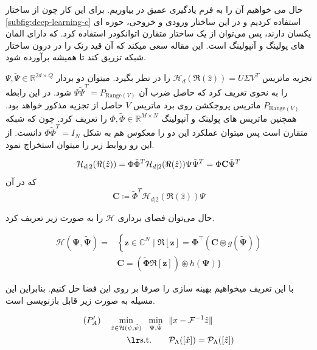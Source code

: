 حال می خواهیم آن را به فرم یادگیری عمیق در بیاوریم. برای این کار چون از ساختار   \ref{subfig:deep-learning-c} استفاده کردیم و در این ساختار ورودی و خروجی، حوزه ای یکسان دارند،  پس می‌توان از یک ساختار متقارن اتوانکودر
استفاده کرد.
که دارای المان های پولینگ
و آنپولینگ
است. این مقاله سعی میکند که آن قید رنک را در درون ساختار شبکه تزریق کند تا همیشه برآورده شود.

تجزیه  ماتریس 
$\mathcal{H}_d(\Re(\hat{z})) =  U \Sigma V^T$
را در نظر بگیرد. میتوان دو بردار 
$\Psi, \tilde{\Psi} \in \mathbb{R}^{2d\times Q}$
را به نحوی تعریف کرد که حاصل ضرب آن 
$\Psi\tilde{\Psi}^T = P_{\mathrm{Range}(V)}$
شود. در این رابطه $P_{\mathrm{Range}(V)}$ ماتریس پروجکشن روی برد ماتریس $V$ حاصل از تجزیه 
مذکور خواهد بود. همچنین ماتریس های پولینک و آنپولینگ 
$\Phi, \tilde{\Phi} \in \mathbb{R}^{M\times N}$
را تعریف کرد. چون که شبکه متقارن است پس میتوان عملکرد این دو را معکوس هم به شکل 
$\Phi\tilde{\Phi}^T = I_{N}$
دانست. از این رو روابط زیر را میتوان استخراج نمود.



\begin{equation}
	\mathcal{H}_{d|2}(\Re(\hat{z})) = \Phi\tilde{\Phi}^T \mathcal{H}_{d|2}(\Re(\hat{z})) \Psi\tilde{\Psi}^T = \Phi \mathbf{C} \tilde{\Psi}^T \\
\end{equation}
که در آن
\begin{equation}
	\mathbf{C} \coloneqq \tilde{\Phi}^T \mathcal{H}_{d|2}(\Re(\hat{z})) \Psi
\end{equation}

حال می‌توان فضای برداری $\mathcal{H}$
را به صورت زیر تعریف کرد.

\begin{equation}
	\begin{aligned}
		\mathcal{H}(\boldsymbol{\Psi}, \tilde{\boldsymbol{\Psi}})=&\left\{\mathbf{z} \in \mathbb{C}^{N} \mid \Re[\mathbf{z}]=\boldsymbol{\Phi}^{\top}(\mathbf{C} \circledast g(\tilde{\boldsymbol{\Psi}}))\right.\\
		&\mathbf{C}=(\tilde{\boldsymbol{\Phi}} \Re[\mathbf{z}]) \circledast h(\boldsymbol{\Psi})\}
	\end{aligned}
\end{equation}

با این تعریف میخواهیم بهینه سازی را صرفا بر روی این فضا حل کنیم. بنابراین این مسیله به صورت زیر قابل بازنویسی است.

\begin{subequations}\label{eq:P'A}
	\begin{align}
		(P'_A) \quad
		\min_{\hat{z}\in\mathbb{\mathcal{H}(\psi, \tilde{\psi})}} \ \
		\min_{\Psi, \tilde{\Psi}} \ \  & \| x - \F^{-1}{\hat{z}}\| \\
		\lrtext{s.t.} \qquad  & \Rho_\Lambda([\hat{x}]) = \Rho_\Lambda([\hat{z}])
	\end{align}
\end{subequations}


